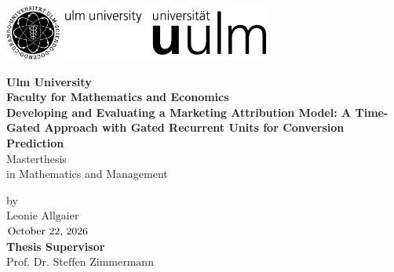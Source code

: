 \documentclass[12pt,enabledeprecatedfontcommands,bibtotoc]{scrreprt}
\theoremstyle{definition}
\begin{document}
\onehalfspacing
\begin{titlepage}
\includegraphics[height=1.8cm]{images/unilogo_bild}
\hfill
\includegraphics[height=1.8cm]{images/unilogo_wort}\\[1em]

\thispagestyle{empty}
\textwidth28cm
\begin{center}
{\Large\bfseries Ulm University\\
   Faculty for Mathematics and Economics\\
}
\vspace{3cm}
{\LARGE\bfseries
Developing and Evaluating a Marketing Attribution Model: 
A Time-Gated Approach with Gated Recurrent Units for Conversion Prediction
\\
}
\vspace{1cm}
{\Large
Masterthesis} \\
\bigskip %
{\Large in Mathematics and Management}
\end{center}
\vspace{1.5cm}
\begin{center}
by \\
$\mbox{Leonie Allgaier}$ \\
$\mbox{\today}$\\

\vspace*{1.2cm}
\textbf{Thesis Supervisor} \\

$\mbox{Prof. Dr. Steffen Zimmermann}$
\end{center}
\vfill
\end{titlepage}


${ }$

\newpage

\tableofcontents
\listoffigures
{}
\setcounter{page}{1} \normalsize
{}
\clearpage
{}












\begin{appendix}

\end{appendix}



${ } $



\end{document}
